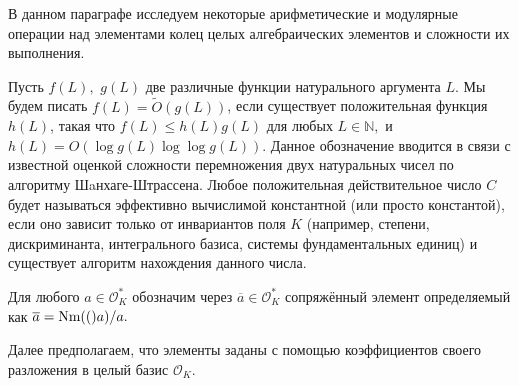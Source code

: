 \documentclass[_00_dissertation.tex]{subfiles}
\begin{document}
В данном параграфе исследуем некоторые арифметические и модулярные операции над элементами колец целых алгебраических элементов и сложности их выполнения.

Пусть $f(L),$ $g(L)$ две различные функции натурального аргумента $L.$ Мы будем писать $f(L)=\tilde O(g(L))$, если существует положительная функция $h(L)$, такая что $f(L)\le h(L)g(L)$ для любых $L\in \mathbb{N},$ и $h(L)=O(\log g(L)\log \log g(L))$. Данное обозначение вводится в связи с известной оценкой сложности перемножения двух натуральных чисел по алгоритму Шaнхаге-Штрассена. Любое положительная действительное число $C$ будет называться эффективно вычислимой константной (или просто константой), если оно зависит только от инвариантов поля $K$ (например, степени, дискриминанта, интегрального базиса, системы фундаментальных единиц) и существует алгоритм нахождения данного числа.

\begin{definition}
    Для любого $a \in \mathcal{O}_K^*$ обозначим через $\overline{a}\in \mathcal{O}_K^*$ сопряжённый элемент определяемый как $\overline{a}=\textrm{Nm}(()a)/a.$
\end{definition}

Далее предполагаем, что элементы заданы с помощью коэффициентов своего разложения в целый базис $\mathcal{O}_K$.
\end{document}
